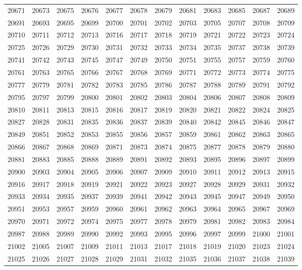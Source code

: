 \begin{center}
\begin{longtable}{llllllllllll}
20671 &20673 &20675 &20676 &20677 &20678 &20679 &20681 &20683 &20685 &20687 &20689 \\
20691 &20693 &20695 &20699 &20700 &20701 &20702 &20703 &20705 &20707 &20708 &20709 \\
20710 &20711 &20712 &20713 &20716 &20717 &20718 &20719 &20721 &20722 &20723 &20724 \\
20725 &20726 &20729 &20730 &20731 &20732 &20733 &20734 &20735 &20737 &20738 &20739 \\
20741 &20742 &20743 &20745 &20747 &20749 &20750 &20751 &20755 &20757 &20759 &20760 \\
20761 &20763 &20765 &20766 &20767 &20768 &20769 &20771 &20772 &20773 &20774 &20775 \\
20777 &20779 &20781 &20782 &20783 &20785 &20786 &20787 &20788 &20789 &20791 &20792 \\
20795 &20797 &20799 &20800 &20801 &20802 &20803 &20804 &20806 &20807 &20808 &20809 \\
20810 &20811 &20813 &20815 &20816 &20817 &20819 &20820 &20821 &20822 &20824 &20825 \\
20827 &20828 &20831 &20835 &20836 &20837 &20839 &20840 &20842 &20845 &20846 &20847 \\
20849 &20851 &20852 &20853 &20855 &20856 &20857 &20859 &20861 &20862 &20863 &20865 \\
20866 &20867 &20868 &20869 &20871 &20873 &20874 &20875 &20877 &20878 &20879 &20880 \\
20881 &20883 &20885 &20888 &20889 &20891 &20892 &20893 &20895 &20896 &20897 &20899 \\
20900 &20903 &20904 &20905 &20906 &20907 &20909 &20910 &20911 &20912 &20913 &20915 \\
20916 &20917 &20918 &20919 &20921 &20922 &20923 &20927 &20928 &20929 &20931 &20932 \\
20933 &20934 &20935 &20937 &20939 &20941 &20942 &20943 &20945 &20947 &20949 &20950 \\
20951 &20953 &20957 &20959 &20960 &20961 &20962 &20963 &20964 &20965 &20967 &20969 \\
20970 &20971 &20972 &20974 &20975 &20977 &20978 &20979 &20981 &20982 &20983 &20984 \\
20987 &20988 &20989 &20990 &20992 &20993 &20995 &20996 &20997 &20999 &21000 &21001 \\
21002 &21005 &21007 &21009 &21011 &21013 &21017 &21018 &21019 &21020 &21023 &21024 \\
21025 &21026 &21027 &21028 &21029 &21031 &21032 &21035 &21036 &21037 &21038 &21039 \\

\end{longtable}
\end{center}
